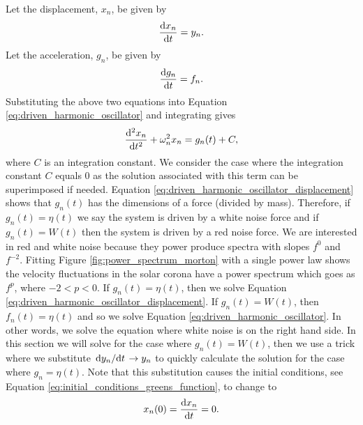 Let the displacement, $x_n$, be given by
\begin{equation}
    \dv{x_n}{t} = y_n.
\end{equation}
Let the acceleration, $g_n$, be given by
\begin{equation}
    \dv{g_n}{t} = f_n.
\end{equation}
Substituting the above two equations into Equation \eqref{eq:driven_harmonic_oscillator} and integrating gives
\begin{equation}
    \label{eq:driven_harmonic_oscillator_displacement}
    \dv[2]{x_n}{t} + \omega_n^2x_n=g_n(t) + C,
\end{equation}
where $C$ is an integration constant. We consider the case where the integration constant $C$ equals 0 as the solution associated with this term can be superimposed if needed. Equation \eqref{eq:driven_harmonic_oscillator_displacement} shows that $g_n(t)$ has the dimensions of a force (divided by mass). Therefore, if $g_n(t)=\eta(t)$ we say the system is driven by a white noise force and if $g_n(t)=W(t)$ then the system is driven by a red noise force. We are interested in red and white noise because they power produce spectra with slopes $f^0$ and $f^{-2}$. Fitting Figure \ref{fig:power_spectrum_morton} with a single power law shows the velocity fluctuations in the solar corona have a power spectrum which goes as $f^p$, where $-2<p<0$. If $g_n(t)=\eta(t)$, then we solve Equation \eqref{eq:driven_harmonic_oscillator_displacement}. If $g_n(t)=W(t)$, then $f_n(t)=\eta(t)$ and so we solve Equation \eqref{eq:driven_harmonic_oscillator}. In other words, we solve the equation where white noise is on the right hand side. In this section we will solve for the case where $g_n(t)=W(t)$, then we use a trick where we substitute $\dv*{y_n}{t}\rightarrow y_n$ to quickly calculate the solution for the case where $g_n = \eta(t)$. Note that this substitution causes the initial conditions, see Equation \eqref{eq:initial_conditions_greens_function}, to change to 
\begin{equation}
    x_n(0) = \dv{x_n}{t} = 0.
\end{equation}

